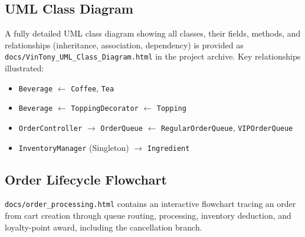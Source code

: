 \documentclass[11pt,a4paper]{article}
\begin{document}
\subsection{UML Class Diagram}
A fully detailed UML class diagram showing all classes, their fields, methods, and relationships (inheritance, association, dependency) is provided as \texttt{docs/VinTony\_UML\_Class\_Diagram.html} in the project archive. Key relationships illustrated:
\begin{itemize}[noitemsep,topsep=2pt]
    \item \texttt{Beverage} $\leftarrow$ \texttt{Coffee}, \texttt{Tea}
    \item \texttt{Beverage} $\leftarrow$ \texttt{ToppingDecorator} $\leftarrow$ \texttt{Topping}
    \item \texttt{OrderController} $\rightarrow$ \texttt{OrderQueue} $\leftarrow$ \texttt{RegularOrderQueue}, \texttt{VIPOrderQueue}
    \item \texttt{InventoryManager} (Singleton) $\rightarrow$ \texttt{Ingredient}
\end{itemize}

\subsection{Order Lifecycle Flowchart}
\texttt{docs/order\_processing.html} contains an interactive flowchart tracing an order from cart creation through queue routing, processing, inventory deduction, and loyalty-point award, including the cancellation branch.
\end{document}
